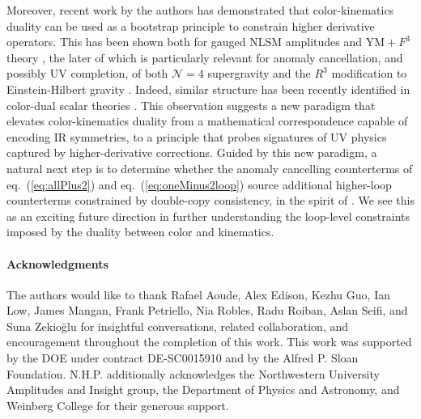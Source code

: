 \documentclass[11pt,letter]{article}
\def\eqn#1{eq.~(\ref{#1})}
\begin{document}
Moreover, recent work by the authors has demonstrated that color-kinematics duality can be used as a bootstrap principle to constrain higher derivative operators. This has been shown both for gauged NLSM amplitudes \cite{Carrasco:2022sck} and $\text{YM}+F^3$ theory \cite{Carrasco:2022lbm}, the later of which is particularly relevant for anomaly cancellation, and possibly UV completion, of both $\mathcal{N}=4$ supergravity and the $R^3$ modification to Einstein-Hilbert gravity \cite{Carrasco:2022lbm}. Indeed, similar structure has been recently identified in color-dual scalar theories \cite{Chen:2022shl,Chen:2023dcx,Brown:2023srz}. This observation suggests a new paradigm that elevates color-kinematics duality from a mathematical correspondence capable of encoding IR symmetries, to a principle that probes signatures of UV physics captured by higher-derivative corrections. 
Guided by this new paradigm, a natural next step is to determine whether the anomaly cancelling counterterms of \eqn{eq:allPlus2} and \eqn{eq:oneMinus2loop} source additional higher-loop counterterms constrained by double-copy consistency, in the spirit of \cite{Carrasco:2022lbm}. 
We see this as an exciting future direction in further understanding the loop-level constraints imposed by the duality between color and kinematics.  


\paragraph{Acknowledgments} The authors would like to thank Rafael Aoude, Alex Edison, Kezhu Guo, Ian Low, James Mangan, Frank Petriello, Nia Robles, Radu Roiban, Aslan Seifi, and Suna Zekio\u{g}lu for insightful conversations, related collaboration, and encouragement throughout the completion of this work. This work was supported by the DOE under contract DE-SC0015910 and by the Alfred P. Sloan Foundation. N.H.P. additionally acknowledges the Northwestern University Amplitudes and Insight group, the Department of Physics and Astronomy, and Weinberg College for their generous support. 



\end{document}
